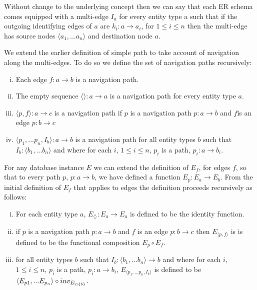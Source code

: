 \documentclass[10pt,a4paper]{article}
\begin{document}
\noindent Without change to the underlying concept then we can say that each ER schema comes equipped with a multi-edge $I_a$ for every entity type a such that if 
the outgoing identifying edges of $a$ are $k_i: a \rightarrow a_i$, for $1 \leq i \leq n$  then the multi-edge has source nodes $\langle a_1,...a_n\rangle$ and destination node $a$.  

\noindent We extend the earlier  definition of simple path to take account of navigation along the multi-edges. To do so we define the set of navigation paths recursively:

\begin{enumerate} [(i)]
\item{ Each edge $f: a \rightarrow b$ is a navigation path.
}
\item{ The empty sequence  $\langle \rangle : a \rightarrow a$ is a navigation path for every entity type $a$.
}
\item{ $\langle p,f \rangle : a \rightarrow c$ is a navigation path  if $p$ is a navigation path $p: a \rightarrow b$ and $f $is an edge $p: b \rightarrow c$
}
\item{ $\langle p_1,...p_n,I_b\rangle : a \rightarrow b$ is a navigation path for all entity types $b$ such that $I_b: \langle b_1,...b_n\rangle$ and where
for each $i$, $1 \leq i \leq n$, $p_i$ is a path, $p_i: a \rightarrow b_i$.   
}
\end{enumerate}

\noindent For any database instance $E$ we can  extend  the definition of
$E_f$, for edges $f$,  so that to every path $p$, $p: a \rightarrow b$,  we have defined a function $E_p: E_a \rightarrow E_b$. From the initial definition of $E_f$ that applies to 
edges the definition proceeds recursively as follows: 
\begin{enumerate} [(i)]
\item{  For each entity type $a$, $E_{\langle \rangle}: E_a \rightarrow E_a$ is defined to be the identity function.
}

\item{   if $p$ is a navigation path $p: a \rightarrow b$ and $f$ is an edge $p: b \rightarrow c$ then $E_{\langle p,f \rangle}$ is 
is defined to be the functional composition $E_p \circ E_f$.
}

\item{ for all entity types $b$ such that $I_b: \langle b_1,...b_n\rangle \rightarrow b$ and where
for each $i$, $1 \leq i \leq n$, $p_i$ is a path, $p_i: a \rightarrow b_i$, $E_{\langle p_1,...p_n,I_b\rangle}$ is defined to be 
$\langle E_{p1},...E_{p_n} \rangle \circ inv_{E_{\i{b}}}$.
}
\end{enumerate}
\end{document}
